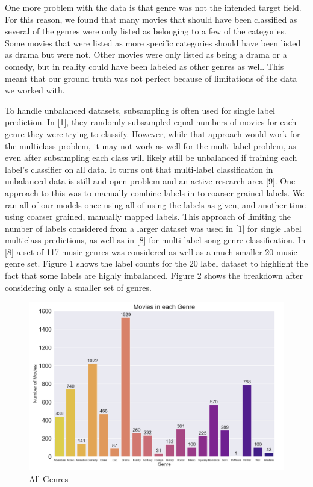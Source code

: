 \documentclass[sigconf]{acmart}
\begin{document}
One more problem with the data is that genre was not the intended target field.  For this reason, we found that many movies that should have been classified as several of the genres were only listed as belonging to a few of the categories.  Some movies that were listed as more specific categories should have been listed as drama but were not. Other movies were only listed as being a drama or a comedy, but in reality could have been labeled as other genres as well.  This meant that our ground truth was not perfect because of limitations of the data we worked with. 

To handle unbalanced datasets, subsampling is often used for single label prediction.  In [1], they randomly subsampled equal numbers of movies for each genre they were trying to classify.  However, while that approach would work for the multiclass problem, it may not work as well for the multi-label problem, as even after subsampling each class will likely still be unbalanced if training each label's classifier on all data. It turns out that multi-label classification in unbalanced data is still and open problem and an active research area [9]. One approach to this was to manually combine labels in to coarser grained labels.  We ran all of our models once using all of using the labels as given, and another time using coarser grained, manually mapped labels. This approach of limiting the number of labels considered from a larger dataset was used in [1] for single label multiclass predictions, as well as in [8] for multi-label song genre classification. In [8] a set of 117 music genres was considered as well as a much smaller 20 music genre set. Figure 1 shows the label counts for the 20 label dataset to highlight the fact that some labels are highly imbalanced. Figure 2 shows the breakdown after considering only a smaller set of genres.

\begin{figure}
	\includegraphics[width=\linewidth]{all_genres.png}
	\caption{All Genres}
	\label{fig:all}
\end{figure}
\end{document}

